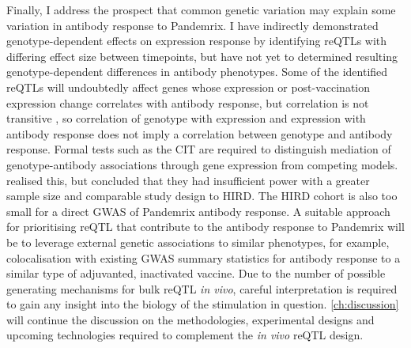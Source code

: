 Finally, I address the prospect that common genetic variation may explain some variation in antibody response to Pandemrix.
I have indirectly demonstrated genotype-dependent effects on expression response by identifying reQTLs with differing effect size between timepoints,
but have not yet to determined resulting genotype-dependent differences in antibody phenotypes.
Some of the identified reQTLs will undoubtedly affect genes whose expression or post-vaccination expression change correlates with antibody response, 
but correlation is not transitive \autocite{langford2001PropertyBeingPositively},
so correlation of genotype with expression and expression with antibody response does not imply a correlation between genotype and antibody response.
Formal tests such as the CIT \autocite{millstein2009DisentanglingMolecularRelationships} are required to distinguish mediation of genotype-antibody associations through gene expression from competing models.
\textcite{franco2013IntegrativeGenomicAnalysis} realised this, but concluded that they had insufficient power with a greater sample size and comparable study design to \gls{HIRD}.
The \gls{HIRD} cohort is also too small for a direct \gls{GWAS} of Pandemrix antibody response.
A suitable approach for prioritising reQTL that contribute to the antibody response to Pandemrix will be to leverage external genetic associations to similar phenotypes,
for example, colocalisation with existing GWAS summary statistics for antibody response to a similar type of adjuvanted, inactivated vaccine.
%
%
Due to the number of possible generating mechanisms for bulk reQTL \textit{in vivo},
careful interpretation is required to gain any insight into the biology of the stimulation in question.
\cref{ch:discussion} will continue the discussion on the methodologies, experimental designs and upcoming technologies 
required to complement the \textit{in vivo} \gls{reQTL} design.

